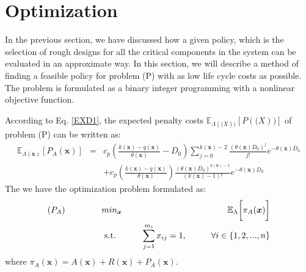 \documentclass[preprint,12pt]{elsarticle}
\begin{document}
\section{Optimization}

In the previous section, we have discussed how a given policy, which is the selection of rough designs for all the critical components in the system can be evaluated in an approximate way. In this section, we will describe a method of finding a feasible policy for problem (P) with as low life cycle costs as possible. The problem is formulated as a binary integer programming with a nonlinear objective function.

According to Eq. \eqref{EXD1}, the expected penalty costs $\mathbb{E}_{\Lambda(\boldsymbol(X))}[P(\boldsymbol(X))]$ of problem (P) can be written as:
\begin{eqnarray}
\mathbb{E}_{\Lambda(\boldsymbol{x})}[P_{A}(\boldsymbol{x})]&=&c_{p}(\frac{k(\boldsymbol{x})-q(\boldsymbol{x})}{\theta(\boldsymbol{x})}-D_{0})\sum_{j=0}^{k(\boldsymbol{x})-2}{\frac{(\theta(\boldsymbol{x}) D_{0})^j}{j!}e^{-\theta(\boldsymbol{x}) D_{0}}}\nonumber\\
&&+c_{p}(\frac{k(\boldsymbol{x})-q(\boldsymbol{x})}{\theta(\boldsymbol{x})})\frac{(\theta(\boldsymbol{x})D_{0})^{k(\boldsymbol{x})-1}}{(k(\boldsymbol{x})-1)!}e^{-\theta(\boldsymbol{x})D_{0}}
\end{eqnarray}
The we have the optimization problem formulated as:
\begin{eqnarray}
\text{($P_{A}$)} \hspace{15mm} & min_{\boldsymbol{x}} & \hspace{10mm} \mathbb{E}_{\Lambda} \bigg[ \pi_{A}(\boldsymbol{x})\bigg] \nonumber\\
& \text{ s.t. }&  \hspace{5mm} \sum_{j=1}^{m_i}{x_{ij}}=1, \hspace{10mm} \forall i \in \{1,2,...,n\} \nonumber
\end{eqnarray}
where $\pi_{A}(\boldsymbol{x})=A(\boldsymbol{x})+R(\boldsymbol{x})+P_{A}(\boldsymbol{x})$.
\end{document}
